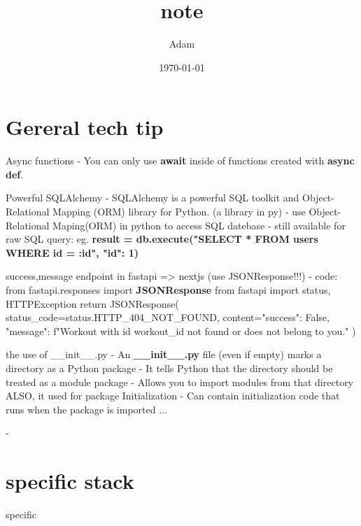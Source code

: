 \documentclass[12pt]{article}
\title{note}
\author{Adam}
\date{\today}
\begin{document}
\maketitle

\section{Gereral tech tip}
\large{Async functions}
- You can only use \textbf{await} inside of functions created with \textbf{async def}.

\large{Powerful SQLAlchemy}
- SQLAlchemy is a powerful SQL toolkit and Object-Relational Mapping (ORM) library for Python. (a library in py)
- use Object-Relational Maping(ORM) in python to access SQL datebase 
- still available for raw SQL query: 
eg.  \textbf{ result = db.execute("SELECT * FROM users WHERE id = :id", {"id": 1}) }

\large{success,message endpoint in fastapi => nextjs (use JSONResponse!!!)}
- code:
from fastapi.responses import \textbf{JSONResponse}
from fastapi import status, HTTPException
return JSONResponse(
    status_code=status.HTTP_404_NOT_FOUND,
    content={"success": False, "message": f"Workout with id {workout_id} not found or does not belong to you."}
)

\large{the use of __init__.py}
- An \textbf{__init__.py} file (even if empty) marks a directory as a Python package
- It tells Python that the directory should be treated as a module package
- Allows you to import modules from that directory
ALSO, it used for package Initialization
- Can contain initialization code that runs when the package is imported
...

\large{}
- 

\section{specific stack}
specific
\end{document}
